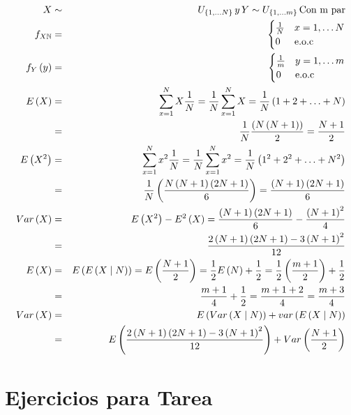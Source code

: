 \begin{enumerate}
\begin{eqnarray*}
X &\sim & U_{ \left\{ 1, \ldots N   \right\}  } \, y \, Y\sim U_{ \left\{ 1, \ldots m    \right\}  } \,  \textrm{Con m par}\\
f_{X\mathbb{N}}&=&\begin{cases}
\frac{1}{N} & x= 1, \ldots N \\
0 & \textrm{e.o.c}
\end{cases}\\
f_{Y}\left(y \right)&=&\begin{cases}
\frac{1}{m} & y= 1, \ldots m \\
0 & \textrm{e.o.c}
\end{cases}\\
E \left(X \right)&=& \sum_{x=1}^{N} X \frac{1}{N}= \frac{1}{N}\sum_{x=1}^{N} X = \frac{1}{N}\left(1+2+\ldots + N \right)\\
&=& \frac{1}{N} \dfrac{\left(N \left(N+1\right)\right)}{2}= \frac{N+1}{2}\\
E \left(X^{2}\right)&=& \sum_{x=1}^{N} x^{2}\frac{1}{N}= \frac{1}{N} \sum_{x=1}^{N} x^{2}= \frac{1}{N} \left( 1^2+2^2+ \ldots+ N^2 \right)\\
&=& \frac{1}{N} \left( \dfrac{N \left(N+1\right)\left(2N+1\right)}{6} \right)= \dfrac{\left(N+1\right)\left(2N+1\right)}{6}\\
Var\left(X\right)&=& E \left(X^2\right)- E^2\left(X\right)= \dfrac{\left(N+1\right)\left(2N+1\right)}{6}- \dfrac{\left(N+1\right)^2}{4}\\
&=&\dfrac{2\left(N+1\right)\left(2N+1\right)-3\left(N+1\right)^2}{12}\\
E\left(X\right)&=& E \left(E\left(X\mid N \right)\right)= E \left(\frac{N+1}{2} \right)= \frac{1}{2} E \left(N \right)+ \frac{1}{2}= \frac{1}{2}\left( \frac{m+1}{2} \right)+\frac{1}{2}\\
&=& \frac{m+1}{4} + \frac{1}{2}= \frac{m+1+2}{4}= \frac{m+3}{4}\\
Var \left(X \right)&=& E\left(Var \left(X \mid N \right) \right)+ var \left(E \left(X \mid N \right) \right)\\
&=& E \left(\dfrac{2\left(N+1\right)\left(2N+1\right)-3\left(N+1\right)^2}{12} \right)  + Var \left(\frac{N+1}{2} \right)
\end{eqnarray*}

\end{enumerate}

\section{Ejercicios para Tarea}

